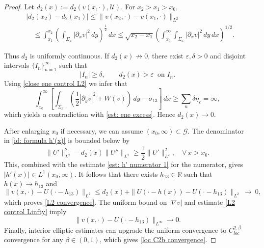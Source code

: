 \documentclass[leqno,11pt]{amsart}
\let\pa=\partial
\let\f=\frac
\let\S=\Sigma
\let\e=\varepsilon
\let\pa=\partial
\let\na=\nabla
\theoremstyle{remark}
\newcommand{\BR}{\mathbb{R}}
\begin{document}
\begin{proof}
Let $d_2(x):=d_2(v(x,\cdot),\mathcal{U})$. For $x_2>x_1>x_0$,
\begin{align*}
 &|d_2(x_2)-d_2(x_1)|\leq\|v(x_2,\cdot)- v(x_1,\cdot)\|_{L^2}\\
 &\quad\leq\int_{x_1}^{x_2} (\int_{\S_x} |\pa_x v|^2\,dy)^{\f12}\,dx
 \leq \sqrt{x_2-x_1}\left(\int_{x_0}^\infty  \int_{\S_x} |\pa_x v|^2\,dy \,dx\right)^{1/2}.   
\end{align*}

Thus $d_2$ is uniformly continuous. If $d_2(x) \not\to 0$, there exist $\e,\delta>0$ and disjoint intervals $\{I_n\}_{n=1}^\infty$ such that 
\begin{equation}
   |I_n|\geq \delta, \qquad d_2(x)>\e \ \text{ on }I_n. 
\end{equation}
Using \eqref{close ene control L2} we infer that 
\[
 \int_{x_0}^\infty \left[\int_{\S_x} \left(\f12|\pa_y v|^2+W(v)\right)\,dy-\sigma_{13}\right] \,dx
 \geq\sum_n \delta \eta_\e =\infty,
\]
which yields a contradiction with \eqref{est: ene excess}. Hence $d_2(x)\to 0$.

After enlarging $x_0$ if necessary, we can assume $(x_0,\infty)\subset \mathcal{G}$. The denominator in \eqref{id: formula h'(x)} is bounded below by \[
\|U'\|_{L^2}^2-d_2(x)\|U''\|_{L^2}\geq \f12\|U'\|_{L^2}^2,\quad \forall\,x>x_0.
\]
This, combined with the estimate \eqref{est: h' numerator 1} for the numerator, gives $|h'(x)|\in L^1(x_0,\infty)$. It follows that there exists $h_{13}\in\BR$ such that $h(x)\to h_{13}$ and
\[
 \|v(x,\cdot)-U(\cdot-h_{13})\|_{L^2}
 \leq d_2(x)+\|U(\cdot-h(x))-U(\cdot-h_{13})\|_{L^2}\ \rightarrow\ 0,
\]
which proves \eqref{L2 convergence}. The uniform bound on $|\na v|$ and estimate \eqref{L2 control Linfty} imply 
\begin{equation}\label{inf conv to hete}
     \|v(x,\cdot)-U(\cdot-h_{13})\|_{L^\infty}\to 0.
\end{equation}
Finally, interior elliptic estimates can upgrade the uniform convergence to $C^{2,\beta}_{loc}$ convergence for any $\beta\in(0,1)$, which gives \eqref{loc C2b convergence}.

\end{proof}
\end{document}

